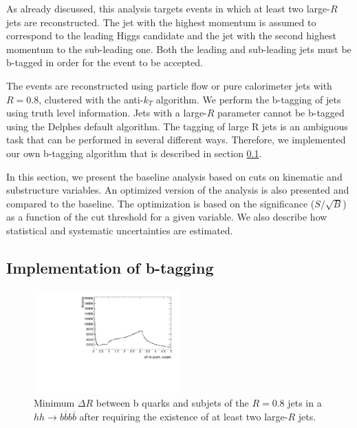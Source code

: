 As already discussed, this analysis targets events in which at least two large-$R$ jets are reconstructed. The jet with the highest momentum is assumed to correspond to the leading Higgs candidate and the jet with the second highest momentum to the sub-leading one. Both the leading and sub-leading jets must be b-tagged in order for the event to be accepted.

The events are reconstructed using particle flow or pure calorimeter jets with $R=0.8$, clustered with the anti-$k_T$ algorithm. We perform the b-tagging of jets using truth level information. Jets with a large-$R$ parameter cannot be b-tagged using the Delphes default algorithm. The tagging of large R jets is an ambiguous task that can be performed in several different ways. Therefore, we implemented our own b-tagging algorithm that is described in section \ref{sec:btagging}. 

In this section, we present the baseline analysis based on cuts on kinematic and substructure variables. An optimized version of the analysis is also presented and compared to the baseline. The optimization is based on the significance ($S/\sqrt{B}$) as a function of the cut threshold for a given variable. We also describe how statistical and systematic uncertainties are estimated. 

\subsection{Implementation of b-tagging}
\label{sec:btagging}

\begin{figure}
	\centering
	\includegraphics[width=0.5\textwidth]{./Figures/deltaR_bsubjet}
	\caption{Minimum $\Delta R$ between b quarks and subjets of the $R=0.8$ jets in a $hh\rightarrow b\overline{b}b\overline{b}$ after requiring the existence of at least two large-$R$ jets.} 
	\label{fig:deltaR_bsubjet}
\end{figure}

